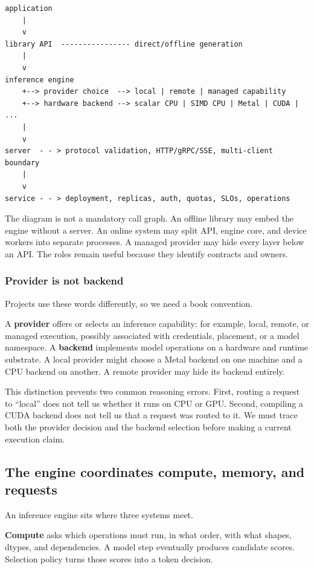 \documentclass[
  10pt,
]{article}
\begin{document}
\begin{verbatim}
application
    |
    v
library API  ---------------- direct/offline generation
    |
    v
inference engine
    +--> provider choice  --> local | remote | managed capability
    +--> hardware backend --> scalar CPU | SIMD CPU | Metal | CUDA | ...
    |
    v
server  - - > protocol validation, HTTP/gRPC/SSE, multi-client boundary
    |
    v
service - - > deployment, replicas, auth, quotas, SLOs, operations
\end{verbatim}

The diagram is not a mandatory call graph. An offline library may embed
the engine without a server. An online system may split API, engine
core, and device workers into separate processes. A managed provider may
hide every layer below an API. The roles remain useful because they
identify contracts and owners.

\subsubsection{Provider is not backend}\label{provider-is-not-backend}

Projects use these words differently, so we need a book convention.

A \textbf{provider} offers or selects an inference capability: for
example, local, remote, or managed execution, possibly associated with
credentials, placement, or a model namespace. A \textbf{backend}
implements model operations on a hardware and runtime substrate. A local
provider might choose a Metal backend on one machine and a CPU backend
on another. A remote provider may hide its backend entirely.

This distinction prevents two common reasoning errors. First, routing a
request to ``local'' does not tell us whether it runs on CPU or GPU.
Second, compiling a CUDA backend does not tell us that a request was
routed to it. We must trace both the provider decision and the backend
selection before making a current execution claim.

\subsection{The engine coordinates compute, memory, and
requests}\label{the-engine-coordinates-compute-memory-and-requests}

An inference engine sits where three systems meet.

\textbf{Compute} asks which operations must run, in what order, with
what shapes, dtypes, and dependencies. A model step eventually produces
candidate scores. Selection policy turns those scores into a token
decision.
\end{document}
